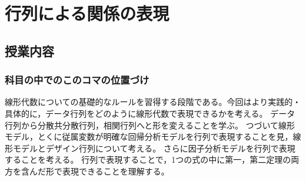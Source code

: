 \section{行列による関係の表現}
\subsection{授業内容}
\subsubsection{科目の中でのこのコマの位置づけ}
線形代数についての基礎的なルールを習得する段階である。今回はより実践的・具体的に，データ行列をどのように線形代数で表現できるかを考える。
データ行列から分散共分散行列，相関行列へと形を変えることを学ぶ。
つづいて線形モデル，とくに従属変数が明確な回帰分析モデルを行列で表現することを見，線形モデルとデザイン行列について考える。
さらに因子分析モデルを行列で表現することを考える。
行列で表現することで，1つの式の中に第一，第二定理の両方を含んだ形で表現できることを理解する。

